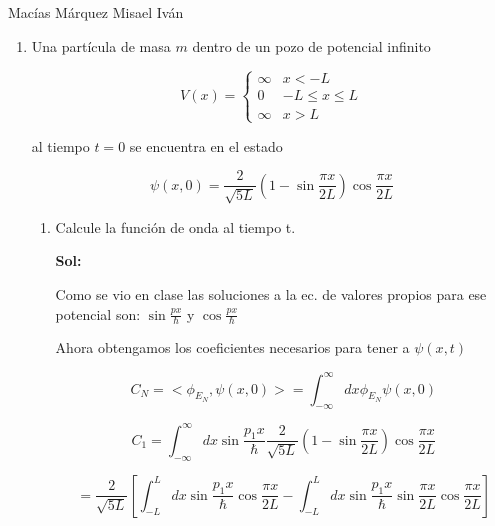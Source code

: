 \documentclass[12pt,a4paper]{article}
\begin{document}
Macías Márquez Misael Iván

\begin{enumerate}






    \item Una partícula de masa $m$ dentro de un pozo de potencial infinito
    
    \begin{equation*}
        V(x) = \left\{\begin{array}{lcc}
             \infty  & x < -L \\
              0 & -L \leq x \leq L\\
              \infty & x > L
             \end{array} \right.
    \end{equation*}
    
    al tiempo $t = 0$ se encuentra en el estado 
    
    \begin{equation*}
        \psi(x,0) = \frac{2}{\sqrt{5L}}\left(1-\sin{\frac{\pi x}{2L}}\right)\cos{\frac{\pi x}{2 L}}
    \end{equation*}
    
    \begin{enumerate}
        \item Calcule la función de onda al tiempo t.
        
        \textbf{Sol:}
        
        Como se vio en clase las soluciones a la ec. de valores propios para ese potencial son: $\sin{\frac{p x}{\hbar}}$ y $\cos{\frac{p x}{\hbar}}$
        
        Ahora obtengamos los coeficientes necesarios para tener a $\psi (x,t)$
        
        \begin{equation*}
            C_N = <\phi_{E_N}, \psi(x,0)> = \int_{-\infty}^{\infty} dx \phi_{E_N} \psi (x,0)
        \end{equation*}
        
        \begin{equation*}
            C_1 = \int_{-\infty}^{\infty} dx \sin{\frac{p_1 x}{\hbar}} \frac{2}{\sqrt{5L}}\left(1-\sin{\frac{\pi x}{2L}}\right)\cos{\frac{\pi x}{2 L}}
        \end{equation*}
        
        \begin{equation*}
            =\frac{2}{\sqrt{5L}}\left[ \int_{-L}^{L} dx  \sin{\frac{p_1 x}{\hbar}} \cos{\frac{\pi x}{2 L}} - \int_{-L}^{L} dx \sin{\frac{p_1 x}{\hbar}} \sin{\frac{\pi x}{2L}} \cos{\frac{\pi x}{2L}}\right]
        \end{equation*}
        

\end{enumerate}
\end{enumerate}
\end{document}
